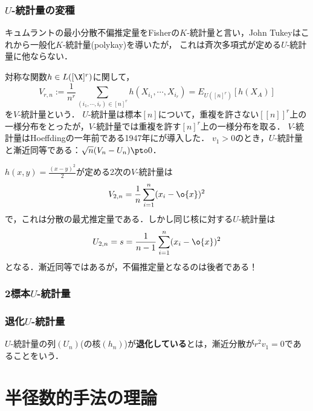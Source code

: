 \documentclass[uplatex,dvipdfmx]{jsreport}
\begin{document}
\subsection{$U$-統計量の変種}

\begin{example}[$K$-statistic]
    キュムラントの最小分散不偏推定量をFisherの$K$-統計量と言い，John Tukeyはこれから一般化$K$-統計量(polykay)を導いたが，
    これは斉次多項式が定める$U$-統計量に他ならない．
\end{example}

\begin{definition}[$V$-statistics]
    対称な関数$h\in L([\X]^r)$に関して，
    \[V_{r,n}:=\frac{1}{n^r}\sum_{(i_1,\cdots,i_r)\in [n]^r}h(X_{i_1},\cdots,X_{i_r})=E_{U([n]^r)}[h(X_A)]\]
    を$V$-統計量という．
    $U$-統計量は標本$[n]$について，重複を許さない$[[n]]^r$上の一様分布をとったが，$V$-統計量では重複を許す$[n]^r$上の一様分布を取る．
    $V$-統計量はHoeffdingの一年前である1947年に\cite{vonMises47-AsymptoticDistributionOfStatisticalFunction}が導入した．
    $v_1>0$のとき，$U$-統計量と漸近同等である：$\sqrt{n}(V_n-U_n)\pto 0$．
\end{definition}

\begin{example}[標本分散と不偏分散]
    $h(x,y)=\frac{(x-y)^2}{2}$が定める2次の$V$-統計量は
    \[V_{2,n}=\frac{1}{n}\sum^n_{i=1}(x_i-\o{x})^2\]
    で，これは分散の最尤推定量である．しかし同じ核に対する$U$-統計量は
    \[U_{2,n}=s=\frac{1}{n-1}\sum^n_{i=1}(x_i-\o{x})^2\]
    となる．漸近同等ではあるが，不偏推定量となるのは後者である！
\end{example}


\subsection{2標本$U$-統計量}

\subsection{退化$U$-統計量}

\begin{definition}[degenerated]
    $U$-統計量の列$(U_n)$(の核$(h_n)$)が\textbf{退化している}とは，漸近分散が$r^2v_1=0$であることをいう．
\end{definition}


\chapter{半径数的手法の理論}
\end{document}
